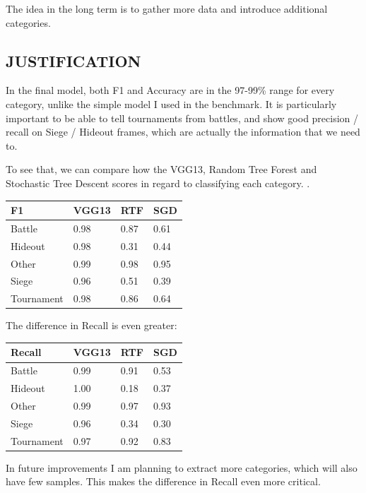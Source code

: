 \documentclass[
]{article}
\begin{document}
The idea in the long term is to gather more data and introduce additional categories.


\hypertarget{justification}{%
\subsection{JUSTIFICATION}\label{justification}}

In the final model, both F1 and Accuracy are in the 97-99\% range for
every category, unlike the simple model I used in the benchmark. It is
particularly important to be able to tell tournaments from battles, and
show good precision / recall on Siege / Hideout frames, which are
actually the information that we need to.

To see that, we can compare how the VGG13, Random Tree Forest and
Stochastic Tree Descent scores in regard to classifying each
category. .

\begin{longtable}[]{@{}llll@{}}
\toprule
F1 & VGG13 & RTF & SGD\tabularnewline
\midrule
\endhead
Battle & 0.98 & 0.87 & 0.61\tabularnewline
Hideout & 0.98 & 0.31 & 0.44\tabularnewline
Other & 0.99 & 0.98 & 0.95\tabularnewline
Siege & 0.96 & 0.51 & 0.39\tabularnewline
Tournament & 0.98 & 0.86 & 0.64\tabularnewline
\bottomrule
\end{longtable}

The difference in Recall is even greater:

\begin{longtable}[]{@{}llll@{}}
\toprule
Recall & VGG13 & RTF & SGD\tabularnewline
\midrule
\endhead
Battle & 0.99 & 0.91 & 0.53\tabularnewline
Hideout & 1.00 & 0.18 & 0.37\tabularnewline
Other & 0.99 & 0.97 & 0.93\tabularnewline
Siege & 0.96 & 0.34 & 0.30\tabularnewline
Tournament & 0.97 & 0.92 & 0.83\tabularnewline
\bottomrule
\end{longtable}

In future improvements I am planning to extract more categories, which
will also have few samples. This makes the difference in Recall even
more critical.
\end{document}
